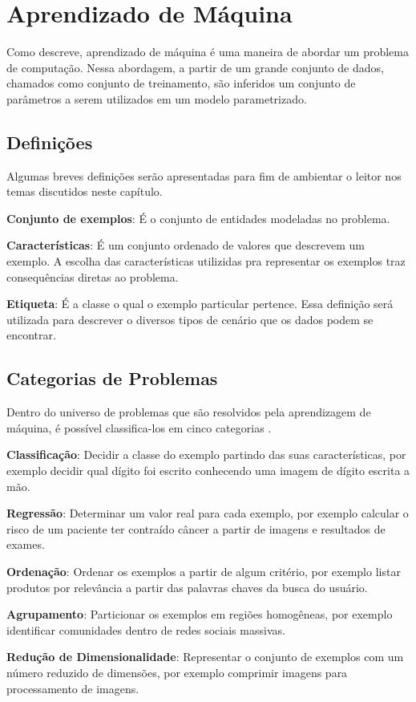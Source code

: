 \chapter{Aprendizado de Máquina}
Como \citet{bishop2006pattern} descreve, aprendizado de máquina é uma maneira de abordar um problema de computação. Nessa abordagem, a partir de um grande conjunto de dados, chamados como conjunto de treinamento, são inferidos um conjunto de parâmetros a serem utilizados em um modelo parametrizado.

\section{Definições}

Algumas breves definições serão apresentadas para fim de ambientar o leitor nos temas discutidos neste capítulo.

\begin{description}
\item \textbf{Conjunto de exemplos}: É o conjunto de entidades modeladas no problema.

\item \textbf{Características}: É um conjunto ordenado de valores que descrevem um exemplo. A escolha das características utilizidas pra representar os exemplos traz consequências diretas ao problema.

\item \textbf{Etiqueta}: É a classe o qual o exemplo particular pertence. Essa definição será utilizada para descrever o diversos tipos de cenário que os dados podem se encontrar.
\end{description}


\section{Categorias de Problemas}

Dentro do universo de problemas que são resolvidos pela aprendizagem de máquina, é possível classifica-los em cinco categorias \citep{mohri2012foundations}.

\begin{description}
\item \textbf{Classificação}: Decidir a classe do exemplo partindo das suas características, por exemplo decidir qual dígito foi escrito conhecendo uma imagem de dígito escrita a mão.
\item \textbf{Regressão}: Determinar um valor real para cada exemplo, por exemplo calcular o risco de um paciente ter contraído câncer a partir de imagens e resultados de exames.
\item \textbf{Ordenação}: Ordenar os exemplos a partir de algum critério, por exemplo listar produtos por relevância a partir das palavras chaves da busca do usuário.
\item \textbf{Agrupamento}: Particionar os exemplos em regiões homogêneas, por exemplo identificar comunidades dentro de redes sociais massivas.
\item \textbf{Redução de Dimensionalidade}: Representar o conjunto de exemplos com um número reduzido de dimensões, por exemplo comprimir imagens para processamento de imagens.
\end{description}

